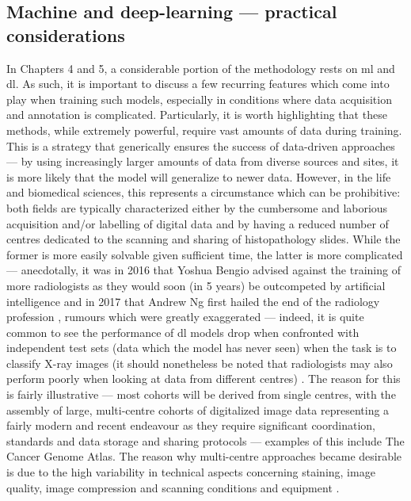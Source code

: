 \begin{figure}
	\label{fig:u-net}
\end{figure}

\subsection{Machine and deep-learning --- practical considerations}

In Chapters 4 and 5, a considerable portion of the methodology rests on \ac{ml} and \ac{dl}. As such, it is important to discuss a few recurring features which come into play when training such models, especially in conditions where data acquisition and annotation is complicated. Particularly, it is worth highlighting that these methods, while extremely powerful, require vast amounts of data during training. This is a strategy that generically ensures the success of data-driven approaches --- by using increasingly larger amounts of data from diverse sources and sites, it is more likely that the model will generalize to newer data. However, in the life and biomedical sciences, this represents a circumstance which can be prohibitive: both fields are typically characterized either by the cumbersome and laborious acquisition and/or labelling of digital data and by having a reduced number of centres dedicated to the scanning and sharing of histopathology slides. While the former is more easily solvable given sufficient time, the latter is more complicated --- anecdotally, it was in 2016 that Yoshua Bengio advised against the training of more radiologists as they would soon (in 5 years) be outcompeted by artificial intelligence \cite{Creative_Destruction_Lab2016-zf} and in 2017 that Andrew Ng first hailed the end of the radiology profession \cite{Ng2017-tz}, rumours which were greatly exaggerated --- indeed, it is quite common to see the performance of \ac{dl} models drop when confronted with independent test sets (data which the model has never seen) when the task is to classify X-ray images (it should nonetheless be noted that radiologists may also perform poorly when looking at data from different centres) \cite{Rajpurkar2021-bj}. The reason for this is fairly illustrative --- most cohorts will be derived from single centres, with the assembly of large, multi-centre cohorts of digitalized image data representing a fairly modern and recent endeavour as they require significant coordination, standards and data storage and sharing protocols --- examples of this include The Cancer Genome Atlas. The reason why multi-centre approaches became desirable is due to the high variability in technical aspects concerning staining, image quality, image compression and scanning conditions and equipment \cite{Van_der_Laak2021-id}.

